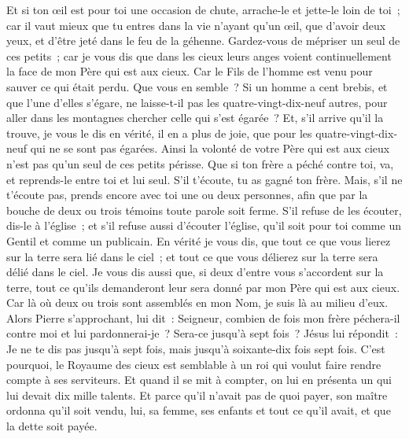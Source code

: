 \begin{multicols}{2}
Et si ton œil est pour toi une occasion de chute, arrache-le et jette-le loin de toi~; car il vaut mieux que tu entres dans la vie n'ayant qu'un œil, que d'avoir deux yeux, et d'être jeté dans le feu de la géhenne.
Gardez-vous de mépriser un seul de ces petits~; car je vous dis que dans les cieux leurs anges voient continuellement la face de mon Père qui est aux cieux.
Car le Fils de l'homme est venu pour sauver ce qui était perdu.
Que vous en semble~? Si un homme a cent brebis, et que l'une d'elles s'égare, ne laisse-t-il pas les quatre-vingt-dix-neuf autres, pour aller dans les montagnes chercher celle qui s'est égarée~?
Et, s'il arrive qu'il la trouve, je vous le dis en vérité, il en a plus de joie, que pour les quatre-vingt-dix-neuf qui ne se sont pas égarées.
Ainsi la volonté de votre Père qui est aux cieux n'est pas qu'un seul de ces petits périsse.
Que si ton frère a péché contre toi, va, et reprends-le entre toi et lui seul. S'il t'écoute, tu as gagné ton frère.
Mais, s'il ne t'écoute pas, prends encore avec toi une ou deux personnes, afin que par la bouche de deux ou trois témoins toute parole soit ferme.
S'il refuse de les écouter, dis-le à l'église~; et s'il refuse aussi d'écouter l'église, qu'il soit pour toi comme un Gentil et comme un publicain.
En vérité je vous dis, que tout ce que vous lierez sur la terre sera lié dans le ciel~; et tout ce que vous délierez sur la terre sera délié dans le ciel.
Je vous dis aussi que, si deux d'entre vous s'accordent sur la terre, tout ce qu'ils demanderont leur sera donné par mon Père qui est aux cieux.
Car là où deux ou trois sont assemblés en mon Nom, je suis là au milieu d'eux.
Alors Pierre s'approchant, lui dit~: Seigneur, combien de fois mon frère péchera-il contre moi et lui pardonnerai-je~? Sera-ce jusqu'à sept fois~?
Jésus lui répondit~: Je ne te dis pas jusqu'à sept fois, mais jusqu'à soixante-dix fois sept fois.
C'est pourquoi, le Royaume des cieux est semblable à un roi qui voulut faire rendre compte à ses serviteurs.
Et quand il se mit à compter, on lui en présenta un qui lui devait dix mille talents.
Et parce qu'il n'avait pas de quoi payer, son maître ordonna qu'il soit vendu, lui, sa femme, ses enfants et tout ce qu'il avait, et que la dette soit payée.

\end{multicols}
